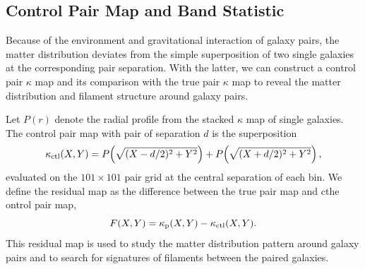 \documentclass[preprint]{aastex701}
\begin{document}
\subsection{Control Pair Map and Band Statistic}
\label{sec:control}

Because of the environment and gravitational interaction of galaxy pairs, the matter distribution deviates from the simple superposition of two single galaxies at the corresponding pair separation. With the latter, we can construct a control pair $\kappa$ map and its comparison with the true pair $\kappa$ map to reveal the matter distribution and filament structure around galaxy pairs.

Let $P(r)$ denote the radial profile from the stacked $\kappa$ map of single galaxies.
The control pair map with pair of separation $d$ is the superposition
\begin{equation}
  \kappa_{\rm ctl}(X,Y) = P\!\left(\sqrt{(X-d/2)^{2}+Y^{2}}\right)
         + P\!\left(\sqrt{(X+d/2)^{2}+Y^{2}}\right),
  \label{eq:control}
\end{equation}
evaluated on the $101\times101$ pair grid at the central separation of each
bin. 
We define the residual map as the difference between the true pair map and cthe ontrol pair map,
\begin{equation}
  F(X,Y) = \kappa_{\rm p}(X,Y)-\kappa_{\rm ctl}(X,Y).
  \label{eq:filament}
\end{equation}
This residual map is used to study the matter distribution pattern around galaxy pairs and to search for signatures of filaments between the
paired galaxies. 
\end{document}
